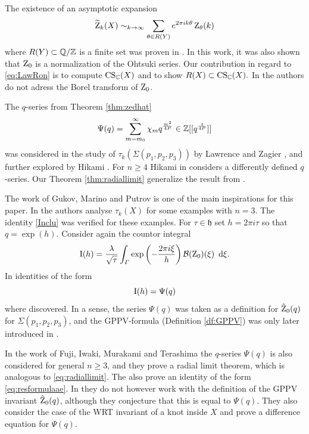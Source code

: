  
 
 The existence of an asymptotic expansion
 \begin{equation}  \label{eq:LawRon} \widetilde{\operatorname{Z}} _k(X) \sim_{k \rightarrow \infty} \sum_{ \theta \in R(Y) } e^{2\pi ik \theta} \operatorname{Z}_{\theta}(k) \end{equation} where $R(Y) \subset \mathbb{Q} / \mathbb{Z} $
 is a finite set was proven in \cite{LawrenceRozansky}. In this work, it was also shown that $\operatorname{Z}_0$ is a normalization of the Ohtsuki series. Our contribution in regard to \eqref{eq:LawRon} is to compute $\operatorname{CS}_{\mathbb{C}}(X)$ and to show $R(X) \subset \operatorname{CS}_{\mathbb{C}}(X).$ 
 In \cite{LawrenceRozansky} the authors do not adress the Borel transform of $\operatorname{Z}_0$.
 
 
 The $q$-series from Theorem \ref{thm:zedhat}
 \begin{equation} \label{eq:q-series}
 \Psi(q)= \sum_{m=m_0}^{\infty} \chi_m q^{\frac{m^2}{4P}} \in \mathbb{Z}[[q^\frac{1}{4P}]]
 \end{equation}
 was considered in the study of  $\tau_k(\Sigma(p_1,p_2,p_3))$ by Lawrence and Zagier \cite{LawrenceZagier}, and further explored by Hikami  \cite{Hikami05}. For $n\geq 4$  Hikami in \cite{Hikami05b} considers a differently defined $q$-series. Our Theorem \ref{thm:radiallimit} generalize the result from \cite{LawrenceZagier}.
 
 The work \cite{GukovMarinoPutrov} of Gukov, Marino and Putrov is one of the main inspirations for this paper. In \cite{GukovMarinoPutrov} the authors analyse $\tau_k(X)$ for some examples with $n=3.$ The identity \eqref{Inclu} was verified for these examples. For $\tau \in \mathfrak{h}$ set $h=2\pi i\tau$ so that $q=\exp(h)$. Consider again the countor integral \begin{equation} \label{eq:contourintegral}
 \operatorname{I}(h)= \frac{\lambda }{ \sqrt{ \tau}} \int_{\varGamma}   \exp\left(- \frac{2\pi i \xi}{h} \right) \mathcal{B}(\operatorname{Z}_0)(\xi) \ \operatorname{{d}\hskip-.6mm} \xi .
 \end{equation}  In \cite{GukovMarinoPutrov} identities of the form 
 \begin{equation} \label{eq:resformulaae} \operatorname{I}(h)=\Psi(q)
 \end{equation} where discovered. In a sense, the series $\Psi(q)$ was taken as a definition for $\hat{\operatorname{Z}}_0(q)$ for $\Sigma(p_1,p_2,p_3)$, and the GPPV-formula (Definition \ref{df:GPPV}) was only later introduced in \cite{GukovPeiPutrovVada18}. 
 
 In the work \cite{Hiroyuki} of Fuji, Iwaki, Murakami and Terashima the $q$-series $\Psi(q)$ is also considered for general $n\geq 3$, and they prove a radial limit theorem, which is analogous to \eqref{eq:radiallimit}. The also prove an identity of the form \eqref{eq:resformulaae}. In \cite{Hiroyuki} they do not however work with the definition of the GPPV invariant $\hat{\operatorname{Z}}_{0}(q)$, although they conjecture that this is equal to $\Psi(q)$. They also consider the  case of the WRT invariant of a knot inside $X$ and prove a difference equation for $\Psi(q)$.
 
